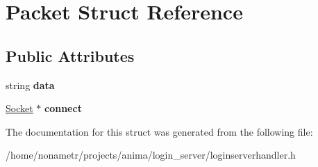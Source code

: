 \hypertarget{structPacket}{
\section{Packet Struct Reference}
\label{structPacket}
}
\subsection*{Public Attributes}
\begin{DoxyCompactItemize}
\item 
\hypertarget{structPacket_a98961f942ac0ff932175cd8558b93814}{
string {\bfseries data}}
\label{structPacket_a98961f942ac0ff932175cd8558b93814}

\item 
\hypertarget{structPacket_a182163515741c6f8310e9170dd994e8a}{
\hyperlink{classSocket}{Socket} $\ast$ {\bfseries connect}}
\label{structPacket_a182163515741c6f8310e9170dd994e8a}

\end{DoxyCompactItemize}


The documentation for this struct was generated from the following file:\begin{DoxyCompactItemize}
\item 
/home/nonametr/projects/anima/login\_\-server/loginserverhandler.h\end{DoxyCompactItemize}
